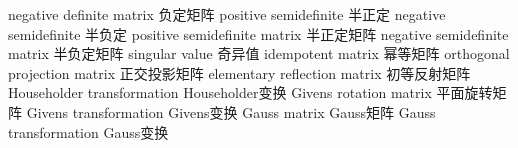 {negative definite matrix}
{负定矩阵}
{positive semidefinite}
{半正定}
{negative semidefinite}
{半负定}
{positive semidefinite matrix}
{半正定矩阵}
{negative semidefinite matrix}
{半负定矩阵}
{singular value}
{奇异值}
{idempotent matrix}
{幂等矩阵}
{orthogonal projection matrix}
{正交投影矩阵}
{elementary reflection matrix}
{初等反射矩阵}
{Householder transformation}
{Householder变换}
{Givens rotation matrix}
{平面旋转矩阵}
{Givens transformation}
{Givens变换}
{Gauss matrix}
{Gauss矩阵}
{Gauss transformation}
{Gauss变换}